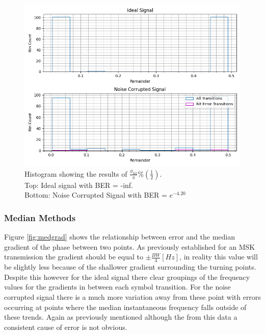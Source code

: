\begin{figure}[h!]
    \centering
    \includegraphics[width = \textwidth]{figs/error/phaseHist.png}
    \caption{\centering Histogram showing the results of $\frac{\phi_{bit}}{\pi} \%\left(\frac{1}{2}\right)$. \\ Top: Ideal signal with BER = -inf. \\ Bottom: Noise Corrupted Signal with BER = $e^{-4.20}$}
    \label{fig:phaseHist}
\end{figure}

\pagebreak
\subsubsection{Median Methods}
Figure \ref{fig:medgrad} shows the relationship between error and the median gradient of the phase between two points. As previously established for an MSK transmission the gradient should be equal to $\pm\frac{BW}{4}[Hz]$, in reality this value will be slightly less because of the shallower gradient surrounding the turning points. Despite this however for the ideal signal there clear groupings of the frequency values for the gradients in between each symbol transition. For the noise corrupted signal there is a much more variation away from these point with errors occurring at points where the median instantaneous frequency falls outside of these trends. Again as previously mentioned although the from this data a consistent cause of error is not obvious.

